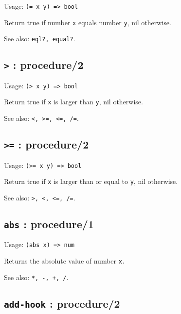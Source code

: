 \documentclass[
]{article}
\newcommand{\passthrough}[1]{#1}
\begin{document}
Usage: \passthrough{\lstinline!(= x y) => bool!}

Return true if number \passthrough{\lstinline!x!} equals number
\passthrough{\lstinline!y!}, nil otherwise.

See also: \passthrough{\lstinline!eql?, equal?!}.

\hypertarget{procedure2-12}{%
\subsection{\texorpdfstring{\texttt{\textgreater{}} :
procedure/2}{\textgreater{} : procedure/2}}\label{procedure2-12}}

Usage: \passthrough{\lstinline!(> x y) => bool!}

Return true if \passthrough{\lstinline!x!} is larger than
\passthrough{\lstinline!y!}, nil otherwise.

See also: \passthrough{\lstinline!<, >=, <=, /=!}.

\hypertarget{procedure2-13}{%
\subsection{\texorpdfstring{\texttt{\textgreater{}=} :
procedure/2}{\textgreater= : procedure/2}}\label{procedure2-13}}

Usage: \passthrough{\lstinline!(>= x y) => bool!}

Return true if \passthrough{\lstinline!x!} is larger than or equal to
\passthrough{\lstinline!y!}, nil otherwise.

See also: \passthrough{\lstinline!>, <, <=, /=!}.

\hypertarget{abs-procedure1-1}{%
\subsection{\texorpdfstring{\texttt{abs} :
procedure/1}{abs : procedure/1}}\label{abs-procedure1-1}}

Usage: \passthrough{\lstinline!(abs x) => num!}

Returns the absolute value of number \passthrough{\lstinline!x.!}

See also: \passthrough{\lstinline!*, -, +, /!}.

\hypertarget{add-hook-procedure2-1}{%
\subsection{\texorpdfstring{\texttt{add-hook} :
procedure/2}{add-hook : procedure/2}}\label{add-hook-procedure2-1}}
\end{document}

